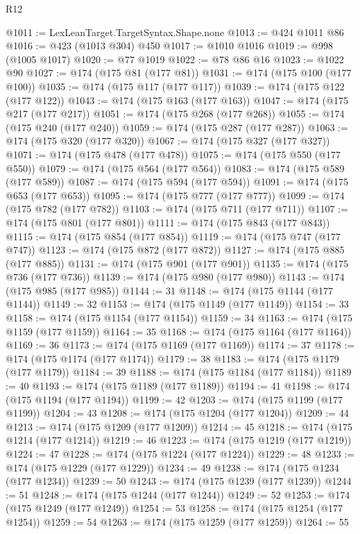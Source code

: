 \begin{lexlean}{R12}
\begin{coremodule}
{{{{{{{{{{{{{{{{{{{{{{{{{{{{{{{{{{{{{{{{{{{{{{{{{{{{{{{{{{{{{{{{{{{{{{{{{{{{{{{{{{{{{{{{{{{{{{{{{{{{{{{{{{@1011 := LexLeanTarget.TargetSyntax.Shape.none
@1013 := @424 @1011 @86
@1016 := @423 (@1013 @304) @450
@1017 := @1010 @1016
@1019 := @998 (@1005 @1017)
@1020 := @77 @1019
@1022 := @78 @86 @16
@1023 := @1022 @90
@1027 := @174 (@175 @81 (@177 @81))
@1031 := @174 (@175 @100 (@177 @100))
@1035 := @174 (@175 @117 (@177 @117))
@1039 := @174 (@175 @122 (@177 @122))
@1043 := @174 (@175 @163 (@177 @163))
@1047 := @174 (@175 @217 (@177 @217))
@1051 := @174 (@175 @268 (@177 @268))
@1055 := @174 (@175 @240 (@177 @240))
@1059 := @174 (@175 @287 (@177 @287))
@1063 := @174 (@175 @320 (@177 @320))
@1067 := @174 (@175 @327 (@177 @327))
@1071 := @174 (@175 @478 (@177 @478))
@1075 := @174 (@175 @550 (@177 @550))
@1079 := @174 (@175 @564 (@177 @564))
@1083 := @174 (@175 @589 (@177 @589))
@1087 := @174 (@175 @594 (@177 @594))
@1091 := @174 (@175 @653 (@177 @653))
@1095 := @174 (@175 @777 (@177 @777))
@1099 := @174 (@175 @782 (@177 @782))
@1103 := @174 (@175 @711 (@177 @711))
@1107 := @174 (@175 @801 (@177 @801))
@1111 := @174 (@175 @843 (@177 @843))
@1115 := @174 (@175 @854 (@177 @854))
@1119 := @174 (@175 @747 (@177 @747))
@1123 := @174 (@175 @872 (@177 @872))
@1127 := @174 (@175 @885 (@177 @885))
@1131 := @174 (@175 @901 (@177 @901))
@1135 := @174 (@175 @736 (@177 @736))
@1139 := @174 (@175 @980 (@177 @980))
@1143 := @174 (@175 @985 (@177 @985))
@1144 := 31
@1148 := @174 (@175 @1144 (@177 @1144))
@1149 := 32
@1153 := @174 (@175 @1149 (@177 @1149))
@1154 := 33
@1158 := @174 (@175 @1154 (@177 @1154))
@1159 := 34
@1163 := @174 (@175 @1159 (@177 @1159))
@1164 := 35
@1168 := @174 (@175 @1164 (@177 @1164))
@1169 := 36
@1173 := @174 (@175 @1169 (@177 @1169))
@1174 := 37
@1178 := @174 (@175 @1174 (@177 @1174))
@1179 := 38
@1183 := @174 (@175 @1179 (@177 @1179))
@1184 := 39
@1188 := @174 (@175 @1184 (@177 @1184))
@1189 := 40
@1193 := @174 (@175 @1189 (@177 @1189))
@1194 := 41
@1198 := @174 (@175 @1194 (@177 @1194))
@1199 := 42
@1203 := @174 (@175 @1199 (@177 @1199))
@1204 := 43
@1208 := @174 (@175 @1204 (@177 @1204))
@1209 := 44
@1213 := @174 (@175 @1209 (@177 @1209))
@1214 := 45
@1218 := @174 (@175 @1214 (@177 @1214))
@1219 := 46
@1223 := @174 (@175 @1219 (@177 @1219))
@1224 := 47
@1228 := @174 (@175 @1224 (@177 @1224))
@1229 := 48
@1233 := @174 (@175 @1229 (@177 @1229))
@1234 := 49
@1238 := @174 (@175 @1234 (@177 @1234))
@1239 := 50
@1243 := @174 (@175 @1239 (@177 @1239))
@1244 := 51
@1248 := @174 (@175 @1244 (@177 @1244))
@1249 := 52
@1253 := @174 (@175 @1249 (@177 @1249))
@1254 := 53
@1258 := @174 (@175 @1254 (@177 @1254))
@1259 := 54
@1263 := @174 (@175 @1259 (@177 @1259))
@1264 := 55
}}}}}}}}}}}}}}}}}}}}}}}}}}}}}}}}}}}}}}}}}}}}}}}}}}}}}}}}}}}}}}}}}}}}}}}}}}}}}}}}}}}}}}}}}}}}}}}}}}}}}}}}}}
\end{coremodule}
\end{lexlean}
